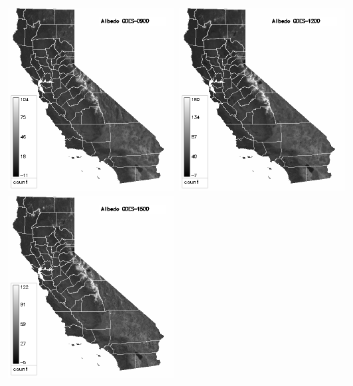 \documentclass{beamer}
\begin{document}
\begin{frame}
  \includegraphics[width=0.33\textwidth]{2006-03-06/p0900.png}
  \includegraphics[width=0.33\textwidth]{2006-03-06/p1200.png}
  \includegraphics[width=0.33\textwidth]{2006-03-06/p1500.png}

\end{frame}
\end{document}
